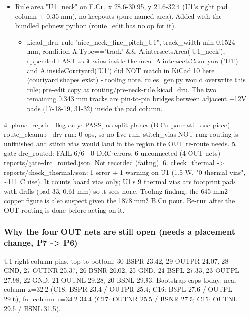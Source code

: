 \documentclass[11pt]{article}
\begin{document}
\begin{itemize}
\item Rule area "U1\_neck" on F.Cu, x 28.6-30.95, y 21.6-32.4 (U1's right pad column + 0.35 mm),
no keepouts (pure named area). Added with the bundled pcbnew python (route\_edit has no op for it).
\begin{itemize}
\item kicad\_dru: rule "aiee\_neck\_fine\_pitch\_U1", track\_width min 0.1524 mm, condition
A.Type=='track' \&\& A.intersectsArea('U1\_neck'), appended LAST so it wins inside the area.
A.intersectsCourtyard('U1') and A.insideCourtyard('U1') did NOT match in KiCad 10 here
(courtyard shapes exist) - tooling note. rules\_gen.py would overwrite this rule; pre-edit
copy at routing/pre-neck-rule.kicad\_dru. The two remaining 0.343 mm tracks are pin-to-pin
bridges between adjacent +12V pads (17-18-19, 31-32) inside the pad column.
\end{itemize}
\end{itemize}
4. plane\_repair --flag-only: PASS, no split planes (B.Cu pour still one piece). route\_cleanup --dry-run: 0 ops, so no live run. stitch\_vias NOT run: routing is unfinished and stitch vias would land in the region the OUT re-route needs. 5. gate drc\_routed: FAIL 6/6 - 0 DRC errors, 6 unconnected (4 OUT nets). reports/gate-drc\_routed.json. Not recorded (failing). 6. check\_thermal -\textgreater{} reports/check\_thermal.json: 1 error + 1 warning on U1 (1.5 W, "0 thermal vias", \textasciitilde{}111 C rise). It counts board vias only; U1's 9 thermal vias are footprint pads with drills (pad 33, 0.61 mm) so it sees none. Tooling finding; the 645 mm2 copper figure is also suspect given the 1878 mm2 B.Cu pour. Re-run after the OUT routing is done before acting on it.

\subsubsection*{Why the four OUT nets are still open (needs a placement change, P7 -\textgreater{} P6)}
U1 right column pins, top to bottom: 30 BSPR 23.42, 29 OUTPR 24.07, 28 GND, 27 OUTNR 25.37, 26 BSNR 26.02, 25 GND, 24 BSPL 27.33, 23 OUTPL 27.98, 22 GND, 21 OUTNL 29.28, 20 BSNL 29.93. Bootstrap caps today: near column x=32.2 (C18: BSPR 23.4 / OUTPR 25.4; C16: BSPL 27.6 / OUTPL 29.6), far column x=34.2-34.4 (C17: OUTNR 25.5 / BSNR 27.5; C15: OUTNL 29.5 / BSNL 31.5).
\end{document}
